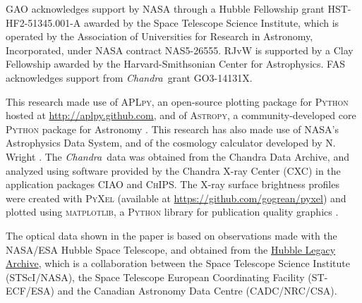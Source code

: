 \documentclass[11pt,a4paper,useAMS,iop]{emulateapj}
\newcommand{\chandra}{\emph{Chandra}}
\begin{document}
\acknowledgments
GAO acknowledges support by NASA through a Hubble Fellowship grant HST-HF2-51345.001-A awarded by the Space Telescope Science Institute, which is operated by the Association of Universities for Research in Astronomy, Incorporated, under NASA contract NAS5-26555. RJvW is supported by a Clay Fellowship awarded by the Harvard-Smithsonian Center for Astrophysics. FAS acknowledges support from \chandra\ grant GO3-14131X.

This research made use of \textsc{APLpy}, an open-source plotting package for \textsc{Python} hosted at \url{http://aplpy.github.com}, and of \textsc{Astropy}, a community-developed core \textsc{Python} package
  for Astronomy \citep{astropy}. This research has also made use of NASA's Astrophysics Data System, and of the cosmology calculator developed by N. Wright \citep{Wright2006}. The \chandra\ data was obtained from the Chandra Data Archive, and analyzed using software provided by the Chandra X-ray Center (CXC) in the application packages \textsc{CIAO} and \textsc{ChIPS}. The X-ray surface brightness profiles were created with \textsc{PyXel} (available at \url{https://github.com/gogrean/pyxel}) and plotted using \textsc{matplotlib}, a \textsc{Python} library for publication quality graphics \citep{Hunter2007}.
  
 The optical data shown in the paper is based on observations made with the NASA/ESA Hubble Space Telescope, and obtained from the \href{http://hla.stsci.edu/}{Hubble Legacy Archive}, which is a collaboration between the Space Telescope Science Institute (STScI/NASA), the Space Telescope European Coordinating Facility (ST-ECF/ESA) and the Canadian Astronomy Data Centre (CADC/NRC/CSA).
\end{document}
